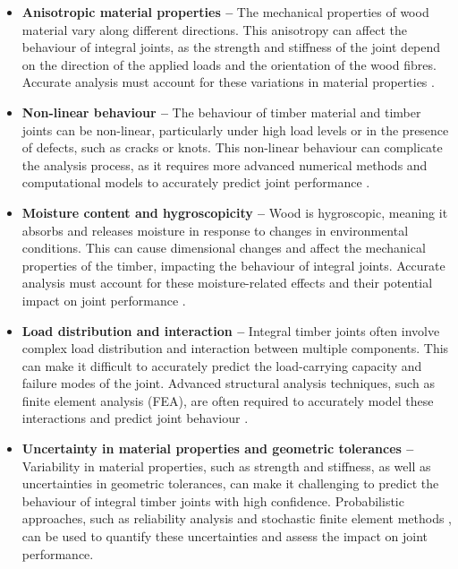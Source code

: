 \begin{itemize}
	\item \textbf{Anisotropic material properties --} The mechanical properties of wood material vary along different directions. This anisotropy can affect the behaviour of integral joints, as the strength and stiffness of the joint depend on the direction of the applied loads and the orientation of the wood fibres. Accurate analysis must account for these variations in material properties \parencite{thelanderssonTimberEngineering2003}.

	\item \textbf{Non-linear behaviour --} The behaviour of timber material and timber joints can be non-linear, particularly under high load levels or in the presence of defects, such as cracks or knots. This non-linear behaviour can complicate the analysis process, as it requires more advanced numerical methods and computational models to accurately predict joint performance \parencite{gustafssonFracturePerpendicularGrain2003, tanadiniAnalysisDesignTimbertotimber2021}.

	\item \textbf{Moisture content and hygroscopicity --} Wood is hygroscopic, meaning it absorbs and releases moisture in response to changes in environmental conditions. This can cause dimensional changes and affect the mechanical properties of the timber, impacting the behaviour of integral joints. Accurate analysis must account for these moisture-related effects and their potential impact on joint performance \parencite{thelanderssonTimberEngineering2003}.

	\item \textbf{Load distribution and interaction --} Integral timber joints often involve complex load distribution and interaction between multiple components. This can make it difficult to accurately predict the load-carrying capacity and failure modes of the joint. Advanced structural analysis techniques, such as finite element analysis (FEA), are often required to accurately model these interactions and predict joint behaviour .

	\item \textbf{Uncertainty in material properties and geometric tolerances --} Variability in material properties, such as strength and stiffness, as well as uncertainties in geometric tolerances, can make it challenging to predict the behaviour of integral timber joints with high confidence. Probabilistic approaches, such as reliability analysis \parencite{ranta-maunusReliabilityAnalysisTimber2001} and stochastic finite element methods \parencite{kandlerStochasticFiniteElement2015}, can be used to quantify these uncertainties and assess the impact on joint performance.

\end{itemize}

